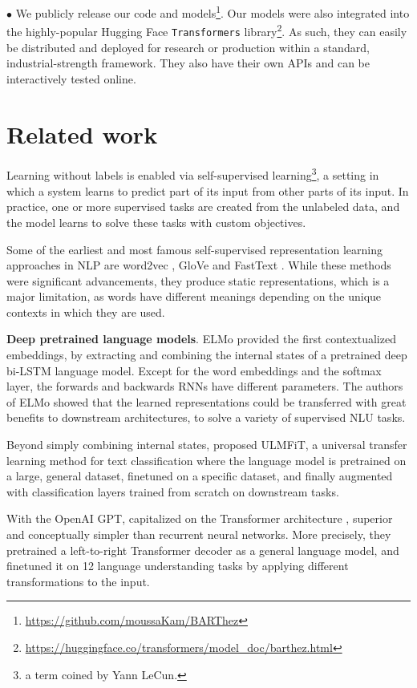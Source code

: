 \documentclass[11pt,a4paper]{article}
\begin{document}
\noindent $\bullet$ We publicly release our code and models\footnote{\tiny \url{https://github.com/moussaKam/BARThez}}.
Our models were also integrated into the highly-popular Hugging Face \texttt{\small Transformers} library\footnote{\tiny \url{https://huggingface.co/transformers/model_doc/barthez.html}}.
As such, they can easily be distributed and deployed for research or production within a standard, industrial-strength framework.
They also have their own APIs and can be interactively tested online.

\section{Related work}
Learning without labels is enabled via self-supervised learning\footnote{a term coined by Yann LeCun.}, a setting in which a system learns to predict part of its input from other parts of its input. In practice, one or more supervised tasks are created from the unlabeled data, and the model learns to solve these tasks with custom objectives.


Some of the earliest and most famous self-supervised representation learning approaches in NLP are word2vec
\cite{mikolov2013distributed}, GloVe \cite{pennington2014glove} and FastText \cite{bojanowski2017enriching}.
While these methods were significant advancements, they produce static representations, which is a major limitation, as words have different meanings depending on the unique contexts in which they are used.

\noindent \textbf{Deep pretrained language models}.
ELMo \cite{peters2018deep} provided the first contextualized embeddings, by extracting and combining the internal states of a pretrained deep bi-LSTM language model.
Except for the word embeddings and the softmax layer, the forwards and backwards RNNs have different parameters.
The authors of ELMo showed that the learned representations could be transferred with great benefits to downstream architectures, to solve a variety of supervised NLU tasks.

Beyond simply combining internal states, \citet{howard2018universal} proposed ULMFiT, a universal transfer learning method for text classification where the language model is pretrained on a large, general dataset, finetuned on a specific dataset, and finally augmented with classification layers trained from scratch on downstream tasks.

With the OpenAI GPT, \citet{radford2018improving} capitalized on the Transformer architecture \cite{vaswani2017attention}, superior and conceptually simpler than recurrent neural networks.
More precisely, they pretrained a left-to-right Transformer decoder as a general language model, and finetuned it on 12 language understanding tasks by applying different transformations to the input.
\end{document}
